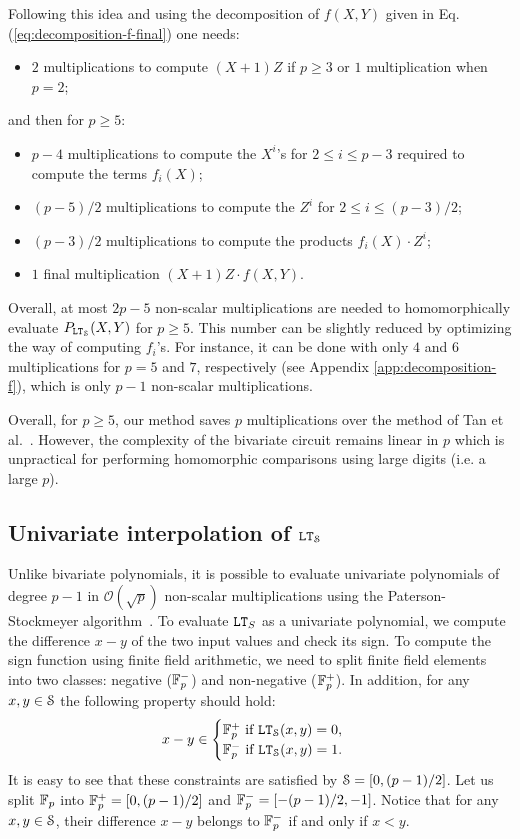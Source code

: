 Following this idea and using the decomposition of $f(X,Y)$ given in Eq. (\ref{eq:decomposition-f-final}) one needs:
\begin{itemize}
\item $2$ multiplications to compute $(X+1)Z$ if $p\geq 3$ or $1$ multiplication when $p=2$;
\end{itemize}
and then for $p\geq 5$:
\begin{itemize}
\item $p-4$ multiplications to compute the $X^i$'s for $2\leq i \leq p-3$ required to compute the terms $f_i(X)$;
\item $(p-5)/2$ multiplications to compute the $Z^i$ for $2\leq i \leq (p-3)/2$;
\item $(p-3)/2$ multiplications to compute the products $f_i(X)\cdot Z^i$;
\item $1$ final multiplication $(X+1)Z\cdot f(X,Y)$.
\end{itemize}
Overall, at most $2p-5$ non-scalar multiplications are needed to homomorphically evaluate $P_{\LT_\S}(X,Y)$ for \mbox{$p \geq 5$}. 
This number can be slightly reduced by optimizing the way of computing $f_i$'s. 
For instance, it can be done with only $4$ and $6$ multiplications for $p=5$ and $7$, respectively (see Appendix \ref{app:decomposition-f}), which is only $p-1$ non-scalar multiplications.

Overall, for $p\geq 5$, our method saves $p$ multiplications over the method of Tan et al.~\cite{TLWRK20}. 
However, the complexity of the bivariate circuit remains linear in $p$ which is unpractical for performing homomorphic comparisons using large digits (i.e. a large $p$).
  
\subsection{Univariate interpolation of $\LT_\S$}
Unlike bivariate polynomials, it is possible to evaluate univariate polynomials of degree $p-1$ in $\mathcal{O}(\sqrt{p})$ non-scalar multiplications using the Paterson-Stockmeyer algorithm~\cite{SIAM:PS73}. 
To evaluate $\LT_S$ as a univariate polynomial, we compute the difference $x-y$ of the two input values and check its sign.
To compute the sign function using finite field arithmetic, we need to split finite field elements into two classes:  negative ($\F_p^-$) and non-negative ($\F_p^+$).
In addition, for any $x, y \in \S$ the following property should hold:
\begin{align*}
  x - y \in 
  \begin{cases}
    \F_p^+ \text{ if } \LT_\S(x,y) = 0, \\
    \F_p^- \text{ if } \LT_\S(x,y) = 1.
  \end{cases}
\end{align*}   
It is easy to see that these constraints are satisfied by $\S = [0, (p-1)/2]$.
Let us split $\F_p$ into $\F_p^+ = [0, (p-1)/2]$ and $\F_p^- = [-(p-1)/2, -1]$.
Notice that for any $x, y \in \S$, their difference $x - y$ belongs to $\F_p^-$ if and only if $x < y$.

